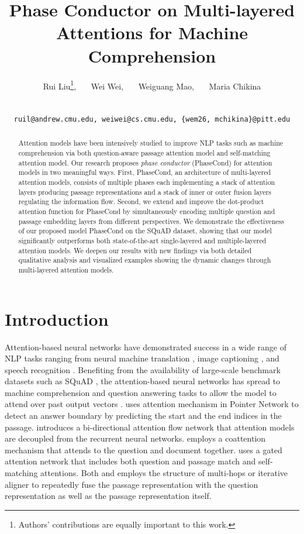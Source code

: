 \documentclass{article} \usepackage{arxiv, times}
\title{Phase Conductor on Multi-layered Attentions for Machine Comprehension}
\author{Rui Liu\affmark[1]\thanks{Authors' contributions are equally important to this work.}, ~~~Wei Wei\affmark[1]\footnotemark[1], ~~~Weiguang Mao\affmark[1,2]\footnotemark[1], ~~~Maria Chikina\affmark[2] \\
\affaddr{\affmark[1]School of Computer Science, Carnegie Mellon University}\\
\affaddr{\affmark[2]Department of Computational \& Systems Biology, University of Pittsburgh}\\
\texttt{ruil@andrew.cmu.edu, weiwei@cs.cmu.edu, \{wem26, mchikina\}@pitt.edu}
}
\begin{document}
\maketitle

\begin{abstract}
Attention models have been intensively studied to improve NLP tasks such as machine comprehension via both question-aware passage attention model and self-matching attention model. Our research proposes \textit{phase conductor} (PhaseCond) for attention models in two meaningful ways. First, PhaseCond, an architecture of multi-layered attention models, consists of multiple phases each implementing a stack of attention layers producing passage representations and a stack of inner or outer fusion layers regulating the information flow. 
Second, we extend and improve the dot-product attention function for PhaseCond by simultaneously encoding multiple question and passage embedding layers from different perspectives. We demonstrate the effectiveness of our proposed model PhaseCond on the SQuAD dataset, showing that our model significantly outperforms both state-of-the-art single-layered and multiple-layered attention models. We deepen our results with new findings via both detailed qualitative analysis and visualized examples showing the dynamic changes through multi-layered attention models.
\end{abstract} \section{Introduction}




Attention-based neural networks have demonstrated success in a wide range of NLP tasks ranging from neural machine translation \citep{bahdanau2014neural}, image captioning \citep{XuBKCCSZB15}, and speech recognition \citep{ChorowskiBSCB15}. Benefiting from the availability of large-scale benchmark datasets such as SQuAD \citep{rajpurkar2016squad}, the attention-based neural networks has spread to machine comprehension and question answering tasks to allow the model to attend over past output vectors \citep{wang2016machine, seo2016bidirectional, xiong2016dynamic, hureinforced, wang2017gated, PanLZCCH17}. \cite{wang2016machine} uses attention mechanism in Pointer Network to detect an answer boundary by predicting the start and the end indices in the passage. \cite{seo2016bidirectional} introduces a bi-directional attention flow network that attention models are decoupled from the recurrent neural networks. \cite{xiong2016dynamic} employs a coattention mechanism that attends to the question and document together. \cite{wang2017gated} uses a gated attention network that includes both question and passage match and self-matching attentions.
Both \cite{PanLZCCH17} and \cite{hureinforced} employs the structure of multi-hops or iterative aligner to repeatedly fuse the passage representation with the question representation as well as the passage representation itself.
\end{document}
